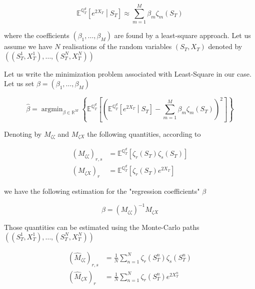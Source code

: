 \documentclass{article}
\DeclareMathOperator*{\argmin}{argmin}
\begin{document}
\begin{equation}
	\mathbb{E}^{\mathbb{Q}_T^d}\left[e^{2X_T}\middle| S_T \right] \approx \sum_{m=1}^{M} \beta_m \zeta_m\left(S_T\right)
\end{equation}

\noindent where the coefficients $(\beta_1, \dots, \beta_M)$ are found by a least-square approach. Let us assume we have $N$ realisations of the random variables $(S_T,X_T)$ denoted by $\left((S_T^1,X_T^1),\dots, (S_T^N,X_T^N)\right)$

\noindent Let us write the minimization problem associated with Least-Square in our case. Let us set $\beta = \left(\beta_1, \dots, \beta_M\right)$

\begin{equation}
	\hat{\beta} = \argmin_{\beta \in \mathbb{R}^M}
\left\{\mathbb{E}^{\mathbb{Q}_T^d}\left[\left(\mathbb{E}^{\mathbb{Q}_T^d}\left[e^{2X_T} \middle| S_T\right] - \sum_{m=1}^M \beta_m \zeta_m\left(S_T\right)\right)^2\right]\right\}
\end{equation}

\noindent Denoting by $M_{\zeta \zeta}$ and $M_{\zeta X}$ the following quantities, according to \cite{Humeau2013}

\begin{equation}
\begin{aligned}
	(M_{\zeta \zeta})_{r,s} &= \mathbb{E}^{\mathbb{Q}_T^d}\left[\zeta_r(S_T)\zeta_s(S_T)\right]\\
	(M_{\zeta X})_r &= \mathbb{E}^{\mathbb{Q}_T^d}\left[\zeta_r(S_T)e^{2X_T}\right]
\end{aligned}
\end{equation}

\noindent we have the following estimation for the "regression coefficients" $\beta$

\begin{equation}	
	\beta = (M_{\zeta \zeta})^{-1} M_{\zeta X}
\end{equation}

\noindent Those quantities can be estimated using the Monte-Carlo paths $\left((S_T^1,X_T^1),\dots, (S_T^N,X_T^N)\right)$

\begin{equation}
\begin{aligned}
	(\hat{M}_{\zeta \zeta})_{r,s} &= \frac{1}{N} \sum_{n=1}^N \zeta_r(S_T^n)\zeta_s(S_T^n)\\
	(\hat{M}_{\zeta X})_r &= \frac{1}{N} \sum_{n=1}^N \zeta_r(S_T^n)e^{2X_T^n}
\end{aligned}
\end{equation}
\end{document}
